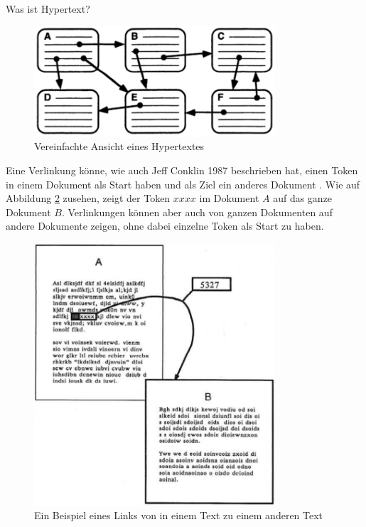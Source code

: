 \begin{section}{Was ist Hypertext?}
\begin{figure}[!ht]
	\centering
	\includegraphics[width=0.8\textwidth]{image/nielsenLink}
	\caption{Vereinfachte Ansicht eines Hypertextes \cite[S.1]{Nielsen1995}}
	\label{fig:nielsenLink}
\end{figure}

Eine Verlinkung könne, wie auch Jeff Conklin 1987 beschrieben hat, einen Token in einem Dokument als Start haben und als Ziel ein anderes Dokument \cite{Conklin1987}. Wie auf Abbildung \ref{fig:imText} zusehen, zeigt der Token $xxxx$ im Dokument $A$ auf das ganze Dokument $B$. Verlinkungen können aber auch von ganzen Dokumenten auf andere Dokumente zeigen, ohne dabei einzelne Token als Start zu haben.

\begin{figure}[!ht]
	\centering
	\includegraphics[width=0.8\textwidth]{image/imText}
	\caption{Ein Beispiel eines Links von in einem Text zu einem anderen Text \cite[S.34]{Conklin1987}}
	\label{fig:imText}
\end{figure}


\end{section}
